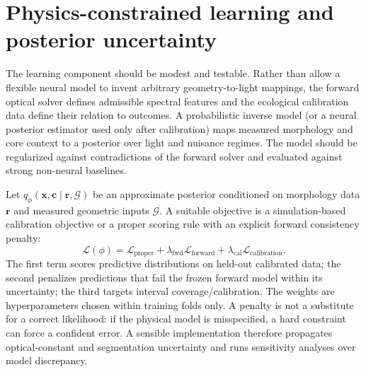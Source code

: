 \documentclass[11pt,a4paper]{article}
\begin{document}
\section{Physics-constrained learning and posterior uncertainty}
The learning component should be modest and testable. Rather than allow a flexible neural model to invent arbitrary geometry-to-light mappings, the forward optical solver defines admissible spectral features and the ecological calibration data define their relation to outcomes. A probabilistic inverse model (or a neural posterior estimator used only after calibration) maps measured morphology and core context to a posterior over light and nuisance regimes. The model should be regularized against contradictions of the forward solver and evaluated against strong non-neural baselines.

Let $q_\phi(\bm{x},\bm{c}\mid\bm{r},\mathcal{G})$ be an approximate posterior conditioned on morphology data $\bm{r}$ and measured geometric inputs $\mathcal{G}$. A suitable objective is a simulation-based calibration objective or a proper scoring rule with an explicit forward consistency penalty:
\begin{equation}
\mathcal{L}(\phi)=\mathcal{L}_{\mathrm{proper}}+\lambda_{\mathrm{fwd}}\mathcal{L}_{\mathrm{forward}}+\lambda_{\mathrm{cal}}\mathcal{L}_{\mathrm{calibration}}.
\label{eq:loss}
\end{equation}
The first term scores predictive distributions on held-out calibrated data; the second penalizes predictions that fail the frozen forward model within its uncertainty; the third targets interval coverage/calibration. The weights are hyperparameters chosen within training folds only. A penalty is not a substitute for a correct likelihood: if the physical model is misspecified, a hard constraint can force a confident error. A sensible implementation therefore propagates optical-constant and segmentation uncertainty and runs sensitivity analyses over model discrepancy.
\end{document}
